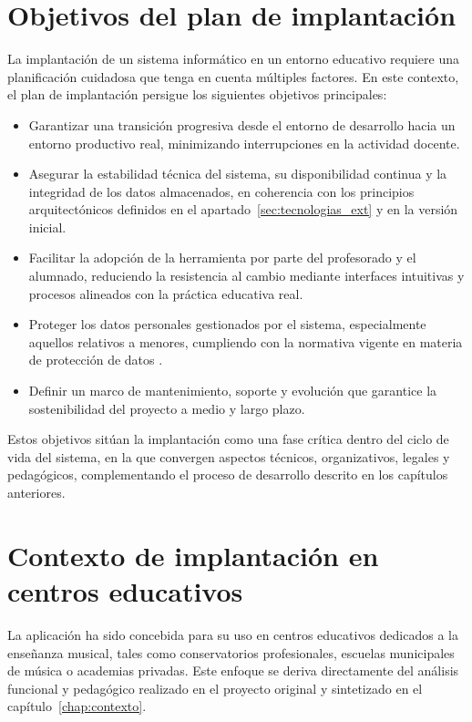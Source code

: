 \section{Objetivos del plan de implantación}
\label{sec:objetivos_implantacion}

La implantación de un sistema informático en un entorno educativo requiere una planificación cuidadosa que tenga en cuenta múltiples factores. En este contexto, el plan de implantación persigue los siguientes objetivos principales:

\begin{itemize}
    \item Garantizar una transición progresiva desde el entorno de desarrollo hacia un entorno productivo real, minimizando interrupciones en la actividad docente.
    \item Asegurar la estabilidad técnica del sistema, su disponibilidad continua y la integridad de los datos almacenados, en coherencia con los principios arquitectónicos definidos en el apartado~\ref{sec:tecnologias_ext} y en la versión inicial.
    \item Facilitar la adopción de la herramienta por parte del profesorado y el alumnado, reduciendo la resistencia al cambio mediante interfaces intuitivas y procesos alineados con la práctica educativa real.
    \item Proteger los datos personales gestionados por el sistema, especialmente aquellos relativos a menores, cumpliendo con la normativa vigente en materia de protección de datos \cite{RGPD2016}.
    \item Definir un marco de mantenimiento, soporte y evolución que garantice la sostenibilidad del proyecto a medio y largo plazo.
\end{itemize}

Estos objetivos sitúan la implantación como una fase crítica dentro del ciclo de vida del sistema, en la que convergen aspectos técnicos, organizativos, legales y pedagógicos, complementando el proceso de desarrollo descrito en los capítulos anteriores.

\section{Contexto de implantación en centros educativos}
\label{sec:contexto_implantacion}

La aplicación ha sido concebida para su uso en centros educativos dedicados a la enseñanza musical, tales como conservatorios profesionales, escuelas municipales de música o academias privadas. Este enfoque se deriva directamente del análisis funcional y pedagógico realizado en el proyecto original y sintetizado en el capítulo~\ref{chap:contexto}.

